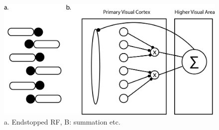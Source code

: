 \documentclass[12pt]{article}
\begin{document}
\begin{figure}[H]
  \centering
  \includegraphics[width=1.0 \textwidth]{adjusted_figures/endstop_mechanism.png}
  \caption{a. Endstopped RF, B: summation etc.}
  \label{fig:endstop_mechanism}
\end{figure}
\end{document}
